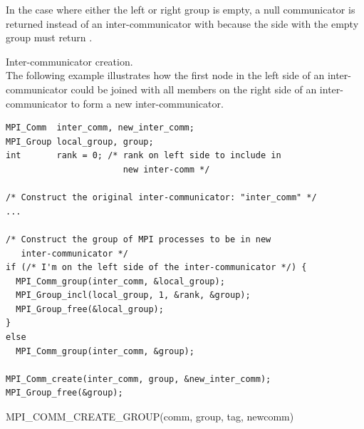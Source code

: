 \begin{rationale}
In the case where either the left or right group is empty, a null communicator
is returned instead of an inter-communicator with 
because the side with the empty group must return .
\end{rationale}

\begin{example}
\label{ex:intercomm creation}
%
%
Inter-communicator creation.\\
The following example illustrates how the first node in the left
side of an inter-communicator could be joined with all members on the
right side of an inter-communicator to form a new
inter-communicator.
\begin{lstlisting}[language={[MPI]C}]
MPI_Comm  inter_comm, new_inter_comm;
MPI_Group local_group, group;
int       rank = 0; /* rank on left side to include in
                       new inter-comm */

/* Construct the original inter-communicator: "inter_comm" */
...

/* Construct the group of MPI processes to be in new
   inter-communicator */
if (/* I'm on the left side of the inter-communicator */) {
  MPI_Comm_group(inter_comm, &local_group);
  MPI_Group_incl(local_group, 1, &rank, &group);
  MPI_Group_free(&local_group);
}
else
  MPI_Comm_group(inter_comm, &group);

MPI_Comm_create(inter_comm, group, &new_inter_comm);
MPI_Group_free(&group);
\end{lstlisting}
\end{example}

\begin{funcdef}{MPI\_COMM\_CREATE\_GROUP}{(\mbox{comm}, \mbox{group}, \mbox{tag}, \mbox{newcomm})}
\end{funcdef}

